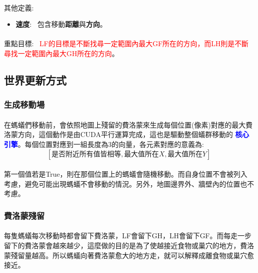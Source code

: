 \documentclass[]{article}
\begin{document}
\paragraph{}
其他定義:
\begin{itemize}
	\item \textbf{速度}: \ 包含移動\textbf{距離}與\textbf{方向}。
\end{itemize}
\paragraph{}
重點目標: \ \textcolor{red}{LF的目標是不斷找尋一定範圍內最大GF所在的方向，而LH則是不斷尋找一定範圍內最大GH所在的方向}。

\subsection{世界更新方式}
\label{algo:world}
\subsubsection{生成移動場}
\label{algo:world:field}
\paragraph{}
在螞蟻們移動前，會依照地圖上殘留的費洛蒙來生成每個位置(像素)對應的最大費洛蒙方向，這個動作是由CUDA平行運算完成，這也是驅動整個蟻群移動的 \textcolor{blue}{\textbf{核心引擎}}。每個位置對應到一組長度為3的向量，各元素對應的意義為:
\begin{equation}\label{algo:world:field:vector}
	[\texttt{是否附近所有值皆相等}, \texttt{最大值所在}X, \texttt{最大值所在}Y]
\end{equation}
\paragraph{}
第一個值若是True，則在那個位置上的螞蟻會隨機移動。而自身位置不會被列入考慮，避免可能出現螞蟻不會移動的情況。另外，地圖邊界外、牆壁內的位置也不考慮。
\subsubsection{費洛蒙殘留}
\label{algo:world:pheromRes}
\paragraph{}
每隻螞蟻每次移動時都會留下費洛蒙，LF會留下GH，LH會留下GF。而每走一步留下的費洛蒙會越來越少，這麼做的目的是為了使越接近食物或巢穴的地方，費洛蒙殘留量越高。所以螞蟻向著費洛蒙愈大的地方走，就可以解釋成離食物或巢穴愈接近。
\end{document}
